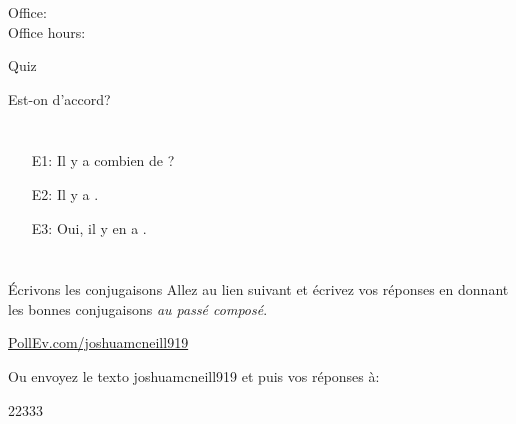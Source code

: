 \documentclass{beamer}
\subtitle[\lexi{En} et passé composé]{Le pronom \lexi{en} et plus de passé composé}
\begin{document}
  \begin{frame}
    \titlepage
    \tiny{Office: \\
          Office hours: }
  \end{frame}

  \begin{frame}{}
    \begin{center}
      \Large Quiz
    \end{center}
  \end{frame}

  \begin{frame}{Est-on d'accord?}
    \begin{columns}
        \begin{itemize}
          \item[E1:] Il y a combien de \underline{}?
          \item[E2:] Il y a \underline{}.
          \item[E3:] Oui, il y en a \underline{}.
        \end{itemize}
        \begin{minipage}[c][0.6\textheight]{\linewidth}
          \begin{center}
          \end{center}
        \end{minipage}
    \end{columns}
  \end{frame}

  \begin{frame}{Écrivons les conjugaisons}
    Allez au lien suivant et écrivez vos réponses en donnant les bonnes conjugaisons \emph{au passé composé}. \\
    \begin{center}
      \url{PollEv.com/joshuamcneill919}
    \end{center}
    Ou envoyez le texto \alert{joshuamcneill919} et puis vos réponses à: \\
    \begin{center}
      22333
    \end{center}
  \end{frame}
\end{document}
